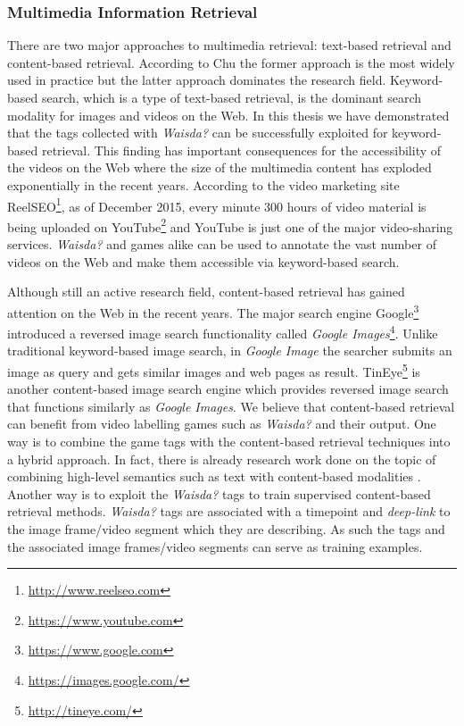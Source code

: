 \subsubsection{Multimedia Information Retrieval}
There are two major approaches to multimedia retrieval: text-based retrieval and content-based retrieval. According to Chu \cite{journals/jasis/Chu01} the former approach is the most widely used in practice but the latter approach dominates the research field. Keyword-based search, which is a type of text-based retrieval, is the dominant search modality for images and videos on the Web. In this thesis we have demonstrated that the tags collected with \textit{Waisda?} can be successfully exploited for keyword-based retrieval. This finding has important consequences for the accessibility of the videos on the Web where the size of the multimedia content has exploded exponentially in the recent years. According to the video marketing site ReelSEO\footnote{\url{http://www.reelseo.com}}, as of December 2015, every minute 300 hours of video material is being uploaded on YouTube\footnote{\url{https://www.youtube.com}}\cite{reelseo} and YouTube is just one of the major video-sharing services. \textit{Waisda?} and games alike can be used to annotate the vast number of videos on the Web and make them accessible via keyword-based search.

Although still an active research field, content-based retrieval has gained attention on the Web in the recent years. The major search engine Google\footnote{\url{https://www.google.com}} introduced a reversed image search functionality called \textit{Google Images}\footnote{\url{https://images.google.com/}}. Unlike traditional keyword-based image search, in \textit{Google Image} the searcher submits an image as query and gets similar images and web pages as result. TinEye\footnote{\url{http://tineye.com/}} is another content-based image search engine which provides reversed image search that functions similarly as \textit{Google Images}. We believe that content-based retrieval can benefit from video labelling games such as \textit{Waisda?} and their output. One way is to combine the game tags with the content-based retrieval techniques into a hybrid approach. In fact, there is already research work done on the topic of combining high-level semantics such as text with content-based modalities \cite{Popescu:2007:ODC:1282280.1282338,Yavlinsky06alarge,citeulike:4000618,Huurnink:2010:TTR:1816041.1816045,snoek2007adding}.
Another way is to exploit the \textit{Waisda?} tags to train supervised content-based retrieval methods. \textit{Waisda?} tags are associated with a timepoint and \textit{deep-link} to the image frame/video segment which they are describing. As such the tags and the associated image frames/video segments can serve as training examples.



